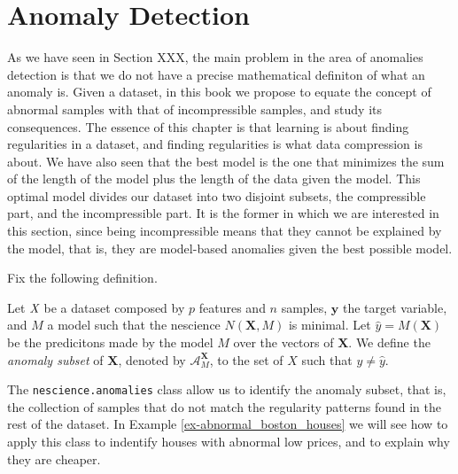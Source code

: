%
%

\section{Anomaly Detection}

As we have seen in Section XXX, the main problem in the area of anomalies detection is that we do not have a precise mathematical definiton of what an anomaly is. Given a dataset, in this book we propose to equate the concept of abnormal samples with that of incompressible samples, and study its consequences. The essence of this chapter is that learning is about finding regularities in a dataset, and finding regularities is what data compression is about. We have also seen that the best model is the one that minimizes the sum of the length of the model plus the length of the data given the model. This optimal model divides our dataset into two disjoint subsets, the compressible part, and the incompressible part. It is the former in which we are interested in this section, since being incompressible means that they cannot be explained by the model, that is, they are model-based anomalies given the best possible model.

{\color{red} Fix the following definition.}

\begin{definition}
Let $\emph{X}$ be a dataset composed by $p$ features and $n$ samples, $\mathbf{y}$ the target variable, and $\mathit{M}$ a model such that the nescience $N \left( \mathbf{X}, \mathit{M} \right)$ is minimal. Let $\hat{y} = \mathit{M} \left( \mathbf{X} \right)$ be the predicitons made by the model $\mathit{M}$ over the vectors of $\mathbf{X}$. We define the \emph{anomaly subset} of $\mathbf{X}$, denoted by $\mathcal{A}_\mathit{M}^\mathbf{X}$, to the set of $X$ such that $y \neq \hat{y}$.
\end{definition}

The \texttt{nescience.anomalies} class allow us to identify the anomaly subset, that is, the collection of samples that do not match the regularity patterns found in the rest of the dataset. In Example \ref{ex-abnormal_boston_houses} we will see how to apply this class to indentify houses with abnormal low prices, and to explain why they are cheaper.

